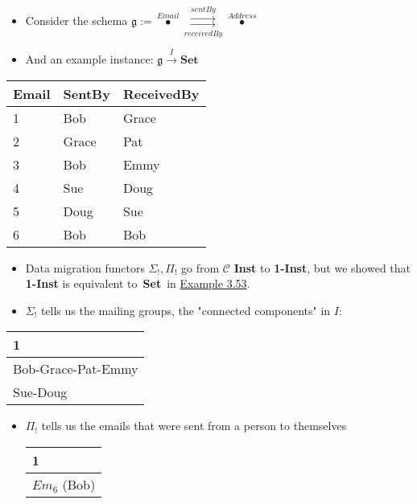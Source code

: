 \begin{itemize}
    \item  Consider the schema $\mathfrak{g} := \boxed{\overset{Email}\bullet \overset{sentBy}{\underset{receivedBy}{\rightrightarrows}} \overset{Address}\bullet}$
    \item And an example instance: $\mathfrak{g}\xrightarrow{I}\mathbf{Set}$
  \end{itemize}

  \begin{minipage}{0.48\textwidth}
    \begin{tabular}{|l|l|l|}
      \hline
      Email & SentBy & ReceivedBy \\ \hline
      1     & Bob    & Grace      \\ \hline
      2     & Grace  & Pat        \\ \hline
      3     & Bob    & Emmy       \\ \hline
      4     & Sue    & Doug       \\ \hline
      5     & Doug   & Sue        \\ \hline
      6     & Bob    & Bob        \\ \hline
    \end{tabular}
  \end{minipage}

  \begin{itemize}
    \item Data migration functors $\Sigma_!,\Pi_!$ go from $\mathcal{C}$ \textbf{Inst} to \textbf{1-Inst}, but we showed that \textbf{1-Inst} is equivalent to \,\textbf{Set}\, in \hyperref[X3.53]{Example 3.53}.
    \item $\Sigma_!$ tells us the mailing groups, the "connected components" in $I$:
  \end{itemize}

  \begin{minipage}{0.48\textwidth}
    \begin{tabular}{|l|}
      \hline
      1                  \\ \hline
      Bob-Grace-Pat-Emmy \\ \hline
      Sue-Doug           \\ \hline
    \end{tabular}
  \end{minipage}

  \begin{itemize}
    \item $\Pi_!$ tells us the emails that were sent from a person to themselves

          \begin{minipage}{0.48\textwidth}
            \begin{tabular}{|l|}
              \hline
              1            \\ \hline
              $Em_6$ (Bob) \\ \hline
            \end{tabular}
          \end{minipage}

  \end{itemize}